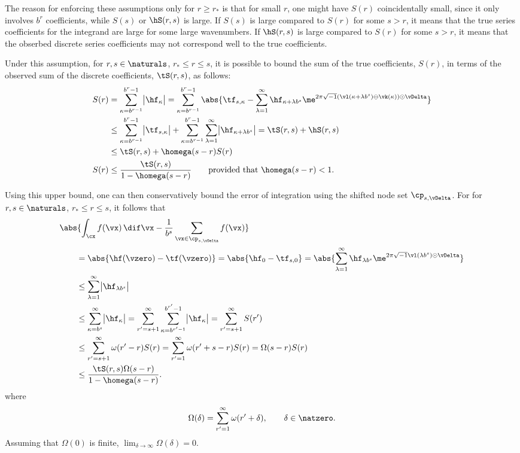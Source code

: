 \documentclass[]{elsarticle}
\theoremstyle{definition}
\theoremstyle{remark}
\begin{document}
The reason for enforcing these assumptions only  for $r \ge r_*$ is that for small $r$, one might have $S(r)$ coincidentally small, since it only involves $b^r$ coefficients, while $S(s)$ or $\hS(r,s)$ is large.  If $S(s)$ is large compared to $S(r)$ for some $s > r$, it means that the true series coefficients for the integrand are large for some large wavenumbers.  If $\hS(r,s)$ is large compared to $S(r)$ for some $s > r$, it means that the obserbed discrete series coefficients may not correspond well to the true coefficients.

Under this assumption, for $r, s \in \naturals$, $r_* \le r \le s$, it is possible to bound the sum of the true coefficients, $S(r)$, in terms of the observed sum of the discrete coefficients, $\tS(r,s)$, as follows:
\begin{align*}
S(r) &= \sum_{\kappa=b^{r-1}}^{b^{r}-1} \bigl \lvert \hf_{\kappa}\bigr\rvert= \sum_{\kappa=b^{r-1}}^{b^{r}-1} \abs{\tf_{s,\kappa} - \sum_{\lambda=1}^{\infty} \hf_{\kappa+\lambda b^{s}} \me^{2 \pi \sqrt{-1} (\vl(\kappa+\lambda b^{s}) \ominus \vk(\kappa)) \odot \vDelta}}\\
&\le \sum_{\kappa=b^{r-1}}^{b^{r}-1} \bigl \lvert \tf_{s,\kappa} \bigr\rvert + \sum_{\kappa=b^{r-1}}^{b^{r}-1} \sum_{\lambda=1}^{\infty} \bigl \lvert \hf_{\kappa+\lambda b^{s}}\bigr\rvert = \tS(r,s) + \hS(r,s) \\
&\le \tS(r,s) + \homega(s-r) S(r) \\
S(r) & \le \frac{\tS(r,s)}{1 - \homega(s-r)} \qquad \text{provided that } \homega(s-r) < 1.
\end{align*}

Using this upper bound, one can then conservatively bound the error of integration using the shifted node set $\cp_{s,\vDelta}$.  For for $r, s \in \naturals$, $r_* \le r \le s$, it follows that
\begin{align*}
\MoveEqLeft{\abs{\int_{\cx} f(\vx) \, \dif \vx - \frac{1}{b^s} \sum_{\vx \in \cp_{s,\vDelta}} f(\vx) }}\\
&= \abs{\hf(\vzero) - \tf(\vzero)} = \abs{\hf_0 - \tf_{s,0}} = \abs{\sum_{\lambda=1}^{\infty} \hf_{\lambda b^{s}} \me^{2 \pi \sqrt{-1} \vl(\lambda b^{s}) \odot \vDelta}}\\
&\le \sum_{\lambda=1}^{\infty} \bigl \lvert \hf_{\lambda b^{s}} \bigr \rvert \\
&\le \sum_{\kappa=b^{s}}^{\infty} \bigl \lvert \hf_{\kappa} \bigr \rvert = \sum_{r'=s+1}^{\infty} \sum_{\kappa=b^{r'-1}}^{b^{r'}-1} \bigl \lvert \hf_{\kappa} \bigr \rvert = \sum_{r'=s+1}^{\infty} S(r')\\
&\le \sum_{r'=s+1}^{\infty} \omega(r'-r) S(r) =   \sum_{r'=1}^{\infty} \omega(r'+s-r) S(r) =  \Omega(s-r) S(r)\\
& \le \frac{\tS(r,s)\Omega(s-r)}{1 - \homega(s-r)}.
\end{align*}
where
\[
\Omega(\delta)=\sum_{r'=1}^{\infty} \omega(r'+ \delta), \qquad \delta \in \natzero.
\]
Assuming that $\Omega(0)$ is finite, $\lim_{\delta \to \infty} \Omega(\delta) = 0$.
\end{document}
